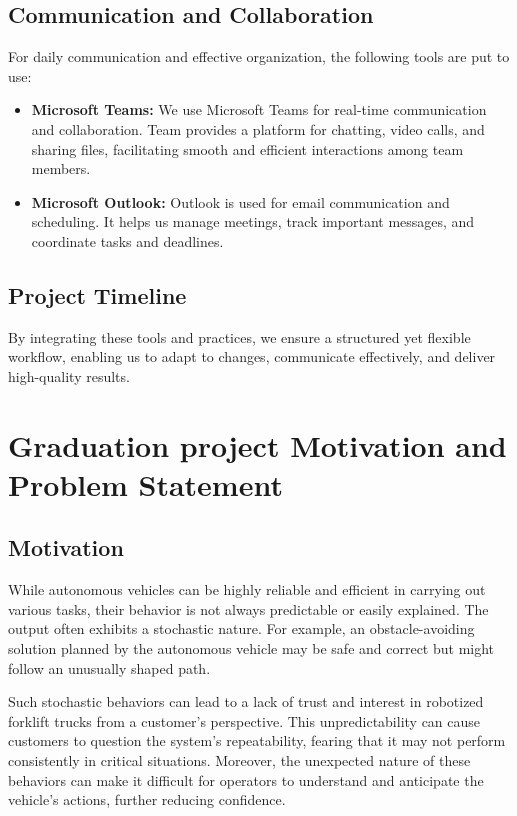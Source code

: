 \subsection{Communication and Collaboration}
For daily communication and effective organization, the following tools are put to use:
\begin{itemize}
\item  \textbf{Microsoft Teams: }We use Microsoft Teams for real-time communication and collaboration. 
Team provides a platform for chatting, video calls, and sharing files, facilitating smooth and efficient 
interactions among team members.

\item  \textbf{Microsoft Outlook: }Outlook is used for email communication and scheduling. It helps us 
manage meetings, track important messages, and coordinate tasks and deadlines.
\end{itemize}

\subsection{Project Timeline}

By integrating these tools and practices, we ensure a structured yet flexible workflow, enabling us to adapt 
to changes, communicate effectively, and deliver high-quality results.


\section{Graduation project Motivation and Problem Statement}

\subsection{Motivation}


While autonomous vehicles can be highly reliable and efficient in carrying out various 
tasks, their behavior is not always predictable or easily explained. The output often 
exhibits a stochastic nature. For example, an obstacle-avoiding solution planned by 
the autonomous vehicle may be safe and correct but might follow an unusually shaped path. 

Such stochastic behaviors can lead to a lack of trust and interest in robotized forklift 
trucks from a customer’s perspective. This unpredictability can cause customers to 
question the system's repeatability, fearing that it may not perform consistently in 
critical situations. Moreover, the unexpected nature of these behaviors can make it 
difficult for operators to understand and anticipate the vehicle's actions, further 
reducing confidence. 

